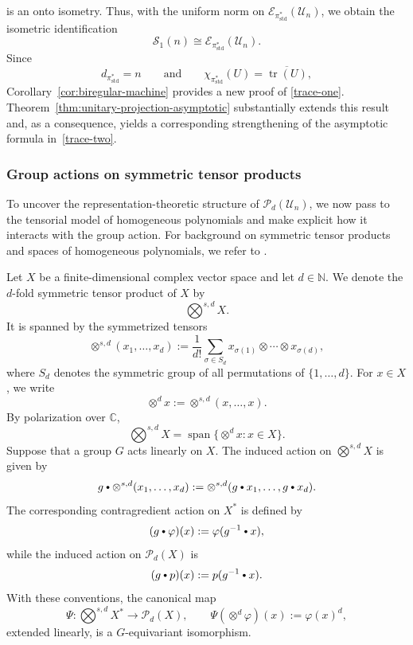 \documentclass[11pt,showkeys]{amsart}
\newcommand{\hbullet}{\mathbin{\vcenter{\hbox{\scalebox{0.7}{$\bullet$}}}}}
\begin{document}
is an onto isometry. Thus, with the uniform norm on
\(\mathcal E_{\pi_{\mathrm{std}}^*}(\mathcal U_n)\), we obtain the
isometric identification
\[
        \mathcal S_1(n)
        \cong
        \mathcal E_{\pi_{\mathrm{std}}^*}(\mathcal U_n).
\]
Since
\[
        d_{\pi_{\mathrm{std}}^*}=n
        \qquad\text{and}\qquad
        \chi_{\pi_{\mathrm{std}}^*}(U)
        =
        \overline{\operatorname{tr}(U)},
\]
Corollary~\ref{cor:biregular-machine} provides a new proof of
\eqref{trace-one}. Theorem~\ref{thm:unitary-projection-asymptotic}
substantially extends this result and, as a consequence, yields a
corresponding strengthening of the asymptotic formula
in~\eqref{trace-two}.




\subsubsection{Group actions on symmetric tensor products}
\label{sec:unitary-symmetric-tensors}
To uncover the representation-theoretic structure of
\(\mathcal P_d(\mathcal U_n)\), we now pass to the tensorial model of
homogeneous polynomials and make explicit how it interacts with the
group action. For background on symmetric tensor products and spaces
of homogeneous polynomials, we refer to
\cite{defant2019libro,dineen2012complex}.


Let \(X\) be a finite-dimensional complex vector space and let
\(d\in\mathbb N\). We denote the \(d\)-fold symmetric tensor product of
\(X\) by
\[
        \bigotimes\nolimits^{s,d}X.
\]
It is spanned by the symmetrized tensors
\[
    \otimes^{s,d}(x_1,\ldots,x_d)
    :=
    \frac{1}{d!}
    \sum_{\sigma\in S_d}
    x_{\sigma(1)}\otimes\cdots\otimes x_{\sigma(d)},
\]
where \(S_d\) denotes the symmetric group of all permutations of
\(\{1,\ldots,d\}\).
For \(x\in X\), we write
\[
        \otimes^d x
        :=
        \otimes^{s,d}(x,\ldots,x).
\]
By polarization over \(\mathbb C\),
\[
        \bigotimes\nolimits^{s,d}X
        =
        \operatorname{span}
        \bigl\{\otimes^d x:x\in X\bigr\}.
\]
Suppose that a group \(G\) acts linearly on \(X\). The induced action on
\(\bigotimes^{s,d}X\) is given by
\[
        g\hbullet
        \otimes^{s,d}(x_1,\ldots,x_d)
        :=
        \otimes^{s,d}
        (g\hbullet x_1,\ldots,g\hbullet x_d).
\]
The corresponding contragredient action on \(X^*\) is defined by
\[
        (g\hbullet\varphi)(x)
        :=
        \varphi(g^{-1}\hbullet x),
\]
while the induced action on \(\mathcal P_d(X)\) is
\[
        (g\hbullet p)(x)
        :=
        p(g^{-1}\hbullet x).
\]
With these conventions, the canonical map
\[
        \Psi:
        \bigotimes\nolimits^{s,d}X^*
        \longrightarrow
        \mathcal P_d(X),
        \qquad
        \Psi(\otimes^d\varphi)(x)
        :=
        \varphi(x)^d,
\]
extended linearly, is a \(G\)-equivariant isomorphism.
\end{document}
